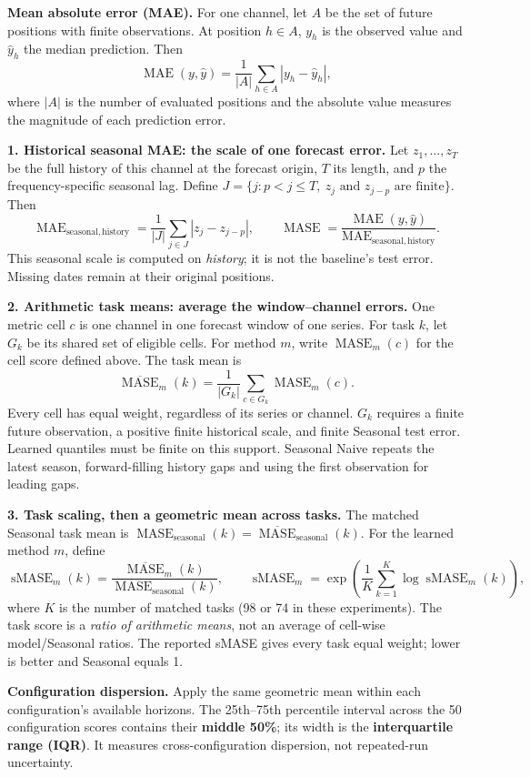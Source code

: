 \documentclass[11pt,a4paper]{article}
\newcommand{\mase}{\operatorname{MASE}}
\newcommand{\smase}{\operatorname{sMASE}}
\newcommand{\mae}{\operatorname{MAE}}
\begin{document}
\textbf{Mean absolute error (MAE).} For one channel, let $A$ be the set
of future positions with finite observations. At position $h\in A$, $y_h$
is the observed value and $\hat y_h$ the median prediction. Then
\[
 \mae(y,\hat y)=\frac{1}{|A|}\sum_{h\in A}|y_h-\hat y_h|,
\]
where $|A|$ is the number of evaluated positions and the absolute value
measures the magnitude of each prediction error.

\textbf{1. Historical seasonal MAE: the scale of one forecast error.}
Let $z_1,\ldots,z_T$ be the full history of this channel at the forecast
origin, $T$ its length, and $p$ the frequency-specific seasonal lag. Define
$J=\{j:p<j\leq T,\ z_j\text{ and }z_{j-p}\text{ are finite}\}$. Then
\[
 \mae_{\mathrm{seasonal,history}}=
 \frac{1}{|J|}\sum_{j\in J}|z_j-z_{j-p}|,
 \qquad
 \mase=\frac{\mae(y,\hat y)}{\mae_{\mathrm{seasonal,history}}}.
\]
This seasonal scale is computed on \emph{history}; it is not the baseline's
test error. Missing dates remain at their original positions.

\textbf{2. Arithmetic task means: average the window--channel errors.}
One metric cell $c$ is one channel in one forecast window of one series.
For task $k$, let $G_k$ be its shared set of eligible cells. For method $m$,
write $\mase_m(c)$ for the cell score defined above. The task mean is
\[
 \overline{\mase}_m(k)=\frac{1}{|G_k|}\sum_{c\in G_k}\mase_m(c).
\]
Every cell has equal weight, regardless of its series or channel.
$G_k$ requires a finite future observation, a positive finite historical
scale, and finite Seasonal test error. Learned quantiles must be finite
on this support. Seasonal Naive repeats the latest season, forward-filling
history gaps and using the first observation for leading gaps.

\textbf{3. Task scaling, then a geometric mean across tasks.}
The matched Seasonal task mean is
$\mase_{\mathrm{seasonal}}(k)=\overline{\mase}_{\mathrm{seasonal}}(k)$.
For the learned method $m$, define
\[
 \smase_m(k)=\frac{\overline{\mase}_m(k)}{\mase_{\mathrm{seasonal}}(k)},
 \qquad
 \smase_m=\exp\!\left(\frac{1}{K}\sum_{k=1}^{K}\log\smase_m(k)\right),
\]
where $K$ is the number of matched tasks (98 or 74 in these experiments).
The task score is a \emph{ratio of arithmetic means}, not an average of
cell-wise model/Seasonal ratios. The reported sMASE gives every task equal
weight; lower is better and Seasonal equals 1.

\textbf{Configuration dispersion.} Apply the same geometric mean within
each configuration's available horizons. The 25th--75th percentile interval
across the 50 configuration scores contains their \textbf{middle 50\%};
its width is the \textbf{interquartile range (IQR)}. It measures
cross-configuration dispersion, not repeated-run uncertainty.
\end{document}
